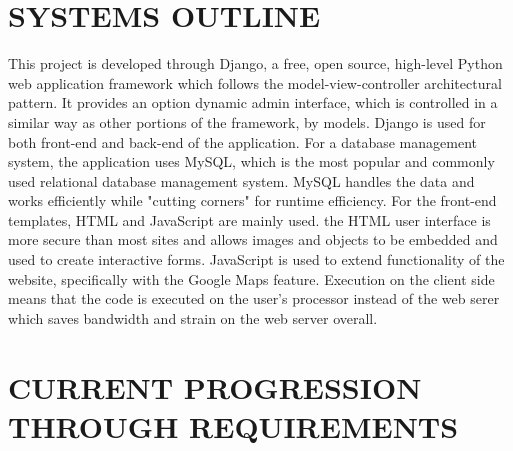 \documentclass[draftclsnofoot,10pt,onecolumn]{IEEEtran} %
\begin{document}
\section{SYSTEMS OUTLINE}
This project is developed through Django, a free, open source, high-level Python web 
application framework which follows the model-view-controller architectural pattern. 
It provides an option dynamic admin interface, which is controlled in a similar way as 
other portions of the framework, by models. Django is used for both front-end and 
back-end of the application.
For a database management system, the application uses MySQL, which is the most popular
and commonly used relational database management system. MySQL handles the data and works 
efficiently while "cutting corners" for runtime efficiency.
For the front-end templates, HTML and JavaScript are mainly used. the HTML user interface 
is more secure than most sites and allows images and objects to be embedded and used to 
create interactive forms. JavaScript is used to extend functionality of the website, 
specifically with the Google Maps feature. Execution on the client side means that the 
code is executed on the user's processor instead of the web serer which saves bandwidth 
and strain on the web server overall.

\section{CURRENT PROGRESSION THROUGH REQUIREMENTS}
\end{document}
